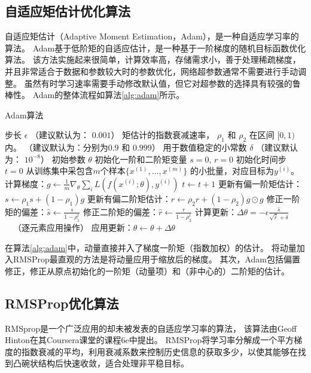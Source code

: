 \subsection{自适应矩估计优化算法}
\label{sec:adam}
自适应矩估计（Adaptive Moment Estimation，Adam），是一种自适应学习率的算法\cite{kingma2014adam}。
Adam基于低阶矩的自适应估计，是一种基于一阶梯度的随机目标函数优化算法。
该方法实施起来很简单，计算效率高，存储需求小，善于处理稀疏梯度，
并且非常适合于数据和参数较大时的参数优化，网络超参数通常不需要进行手动调整。
虽然有时学习速率需要手动修改默认值，但它对超参数的选择具有较强的鲁棒性。
Adam的整体流程如算法\ref{alg:adam}所示。
\begin{algorithm}[ht]
	\caption{Adam算法}
	\label{alg:adam}
	\begin{algorithmic}
		\REQUIRE 步长 $\epsilon$ （建议默认为： $0.001$）
		\REQUIRE 矩估计的指数衰减速率， $\rho_1$ 和 $\rho_2$ 在区间 $[0, 1)$内。
		（建议默认为：分别为$0.9$ 和 $0.999$）
		\REQUIRE 用于数值稳定的小常数 $\delta$  （建议默认为： $10^{-8}$）
		\REQUIRE 初始参数 $\theta$
		\STATE 初始化一阶和二阶矩变量 $s = 0 $, $r = 0$
		\STATE 初始化时间步 $t=0$ 
		\STATE 从训练集中采包含$m$个样本$\{ x^{(1)},\dots, x^{(m)}\}$ 的小批量，对应目标为$y^{(i)}$。
		\STATE 计算梯度：$g \leftarrow \frac{1}{m} \nabla_{\theta} \sum_i L(f(x^{(i)};\theta),y^{(i)})$ 
		\STATE $t \leftarrow t + 1$
		\STATE 更新有偏一阶矩估计： $s \leftarrow \rho_1 s + (1-\rho_1) g$
		\STATE 更新有偏二阶矩估计：$r \leftarrow \rho_2 r + (1-\rho_2)  g \odot g$
		\STATE 修正一阶矩的偏差：$\hat{s} \leftarrow \frac{s}{1-\rho_1^t}$
		\STATE 修正二阶矩的偏差：$\hat{r} \leftarrow \frac{r}{1-\rho_2^t}$
		\STATE 计算更新：$\Delta \theta = - \epsilon \frac{\hat{s}}{\sqrt{\hat{r}} + \delta}$ \ \  （逐元素应用操作）
		\STATE 应用更新：$\theta \leftarrow \theta + \Delta \theta$
		\ENDWHILE
	\end{algorithmic}
\end{algorithm}
在算法\ref{alg:adam}中，动量直接并入了梯度一阶矩（指数加权）的估计。
将动量加入RMSProp最直观的方法是将动量应用于缩放后的梯度。
其次，Adam包括偏置修正，修正从原点初始化的一阶矩（动量项）和（非中心的）二阶矩的估计。
\par

\subsection{RMSProp优化算法}
RMSprop是一个广泛应用的却未被发表的自适应学习率的算法，
该算法由Geoff Hinton在其Coursera课堂的课程6e中提出\cite{tieleman2012lecture}。
RMSProp将学习率分解成一个平方梯度的指数衰减的平均，利用衰减系数来控制历史信息的获取多少，以使其能够在找到凸碗状结构后快速收敛，适合处理非平稳目标。\par

